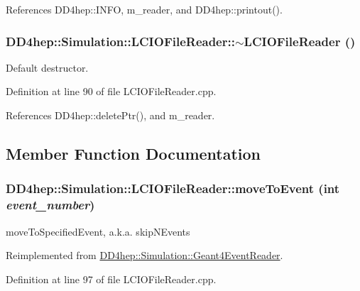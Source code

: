 References DD4hep::INFO, m\_\-reader, and DD4hep::printout().\hypertarget{class_d_d4hep_1_1_simulation_1_1_l_c_i_o_file_reader_aa8bf3dbda65e5c2443027f2dd94390e4}{
\subsubsection[{$\sim$LCIOFileReader}]{\setlength{\rightskip}{0pt plus 5cm}DD4hep::Simulation::LCIOFileReader::$\sim$LCIOFileReader ()}}
\label{class_d_d4hep_1_1_simulation_1_1_l_c_i_o_file_reader_aa8bf3dbda65e5c2443027f2dd94390e4}


Default destructor. 

Definition at line 90 of file LCIOFileReader.cpp.

References DD4hep::deletePtr(), and m\_\-reader.

\subsection{Member Function Documentation}
\hypertarget{class_d_d4hep_1_1_simulation_1_1_l_c_i_o_file_reader_ad4648d75cd88d24476ff41e493b5c0ed}{
\subsubsection[{moveToEvent}]{ DD4hep::Simulation::LCIOFileReader::moveToEvent (int {\em event\_\-number})}}
\label{class_d_d4hep_1_1_simulation_1_1_l_c_i_o_file_reader_ad4648d75cd88d24476ff41e493b5c0ed}


moveToSpecifiedEvent, a.k.a. skipNEvents 

Reimplemented from \hyperlink{class_d_d4hep_1_1_simulation_1_1_geant4_event_reader_a0b6d2fe12ae259534cbe7a5b6e35b642}{DD4hep::Simulation::Geant4EventReader}.

Definition at line 97 of file LCIOFileReader.cpp.

